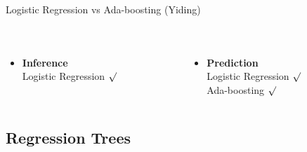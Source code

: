 \documentclass[table]{beamer}\usepackage[]{graphicx}\usepackage[]{color}
\begin{document}
\begin{frame}{Logistic Regression vs Ada-boosting (Yiding)}
\begin{columns}[t]
\begin{column}[t]{8cm}
\begin{table}[ht]
{\begin{tabular}{ccccc}
\end{tabular}
}
\end{table}
\end{column}
\end{columns}


\begin{minipage}{\textwidth}
{\fontsize{0.3cm}{1em}\selectfont
\begin{columns}[t]


\begin{column}[t]{4cm}
\begin{itemize}
\item \textbf{Inference}\\
Logistic Regression $\surd$
\end{itemize}
\end{column}


\begin{column}[t]{8cm}
\begin{itemize}
\item \textbf{Prediction}\\
Logistic Regression $\surd$\\
Ada-boosting $\surd$
\end{itemize}
\end{column}


\end{columns}
}
\end{minipage}


\end{frame}


\subsection{Regression Trees}

\end{document}
